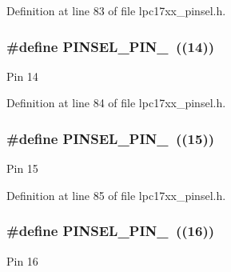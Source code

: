 Definition at line 83 of file lpc17xx\+\_\+pinsel.\+h.

\subsubsection[{\texorpdfstring{P\+I\+N\+S\+E\+L\+\_\+\+P\+I\+N\+\_\+14}{PINSEL_PIN_14}}]{\setlength{\rightskip}{0pt plus 5cm}\#define P\+I\+N\+S\+E\+L\+\_\+\+P\+I\+N\+\_~((14))}\hypertarget{group___p_i_n_s_e_l___public___macros_ga953c421f0a1e597783224c8fbd2402ef}{}\label{group___p_i_n_s_e_l___public___macros_ga953c421f0a1e597783224c8fbd2402ef}
Pin 14 

Definition at line 84 of file lpc17xx\+\_\+pinsel.\+h.

\subsubsection[{\texorpdfstring{P\+I\+N\+S\+E\+L\+\_\+\+P\+I\+N\+\_\+15}{PINSEL_PIN_15}}]{\setlength{\rightskip}{0pt plus 5cm}\#define P\+I\+N\+S\+E\+L\+\_\+\+P\+I\+N\+\_~((15))}\hypertarget{group___p_i_n_s_e_l___public___macros_ga0687cf1015a3d95844c2df3584797d75}{}\label{group___p_i_n_s_e_l___public___macros_ga0687cf1015a3d95844c2df3584797d75}
Pin 15 

Definition at line 85 of file lpc17xx\+\_\+pinsel.\+h.

\subsubsection[{\texorpdfstring{P\+I\+N\+S\+E\+L\+\_\+\+P\+I\+N\+\_\+16}{PINSEL_PIN_16}}]{\setlength{\rightskip}{0pt plus 5cm}\#define P\+I\+N\+S\+E\+L\+\_\+\+P\+I\+N\+\_~((16))}\hypertarget{group___p_i_n_s_e_l___public___macros_ga7f7070e9cf520a08cbdd2daa09e90022}{}\label{group___p_i_n_s_e_l___public___macros_ga7f7070e9cf520a08cbdd2daa09e90022}
Pin 16 

